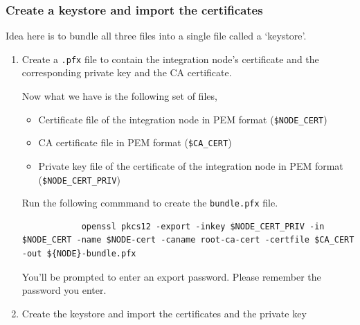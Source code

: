 \documentclass{article}
\begin{document}
    \subsubsection{Create a keystore and import the certificates}
    Idea here is to bundle all three files into a single file called a `keystore'.

    \begin{enumerate}[itemsep=4ex]
        \item Create a \texttt{.pfx} file to contain the integration node's certificate and the corresponding private key and the CA certificate.

        Now what we have is the following set of files,
        \begin{itemize}
            \item Certificate file of the integration node in PEM format (\lstinline{$NODE_CERT})
            \item CA certificate file in PEM format (\lstinline{$CA_CERT})
            \item Private key file of the certificate of the integration node in PEM format (\lstinline{$NODE_CERT_PRIV})
        \end{itemize}

        Run the following commmand to create the \texttt{bundle.pfx} file.
        \begin{lstlisting}
            openssl pkcs12 -export -inkey $NODE_CERT_PRIV -in $NODE_CERT -name $NODE-cert -caname root-ca-cert -certfile $CA_CERT -out ${NODE}-bundle.pfx
        \end{lstlisting}
        You'll be prompted to enter an export password. Please remember the password you enter.

        \item Create the keystore and import the certificates and the private key


\end{enumerate}
\end{document}
